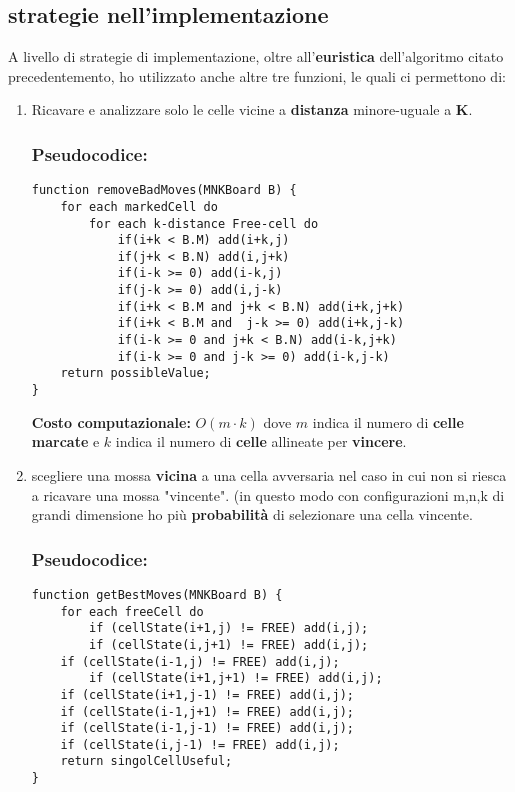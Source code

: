 \documentclass{article}
\begin{document}
    \subsection{strategie nell’implementazione}
    A livello di strategie di implementazione, oltre all'\textbf{euristica} dell'algoritmo citato precedentemento, ho utilizzato anche altre tre funzioni, le quali ci permettono di:
    \begin{enumerate}
        \item Ricavare e analizzare solo le celle vicine a \textbf{distanza} minore-uguale a \textbf{K}. 
            \subsubsection{Pseudocodice:}
    \lstset{language=java}
    \begin{lstlisting}[frame=single]  
function removeBadMoves(MNKBoard B) {
    for each markedCell do
        for each k-distance Free-cell do 
            if(i+k < B.M) add(i+k,j)
    	    if(j+k < B.N) add(i,j+k)
    	    if(i-k >= 0) add(i-k,j)
    	    if(j-k >= 0) add(i,j-k)
    	    if(i+k < B.M and j+k < B.N) add(i+k,j+k)
    	    if(i+k < B.M and  j-k >= 0) add(i+k,j-k)
    	    if(i-k >= 0 and j+k < B.N) add(i-k,j+k)
    	    if(i-k >= 0 and j-k >= 0) add(i-k,j-k)
    return possibleValue;
}
    \end{lstlisting}
        
        \textbf{Costo computazionale:} $O(m \cdot k)$ dove $m$ indica il numero di \textbf{celle marcate} e $k$ indica il numero di \textbf{celle} allineate per \textbf{vincere}.
        
        \item scegliere una mossa \textbf{vicina} a una cella avversaria nel caso in cui non si riesca a ricavare una mossa "vincente". (in questo modo con configurazioni m,n,k di grandi dimensione ho più \textbf{probabilità} di selezionare una cella vincente. 
        
    \subsubsection{Pseudocodice:}
    \lstset{language=java}
    \begin{lstlisting}[frame=single]  
function getBestMoves(MNKBoard B) {
    for each freeCell do
        if (cellState(i+1,j) != FREE) add(i,j);
        if (cellState(i,j+1) != FREE) add(i,j);
	if (cellState(i-1,j) != FREE) add(i,j);
        if (cellState(i+1,j+1) != FREE) add(i,j);
	if (cellState(i+1,j-1) != FREE) add(i,j);
	if (cellState(i-1,j+1) != FREE) add(i,j);
	if (cellState(i-1,j-1) != FREE) add(i,j);
	if (cellState(i,j-1) != FREE) add(i,j);
    return singolCellUseful;
}
    \end{lstlisting}
        

\end{enumerate}
\end{document}
